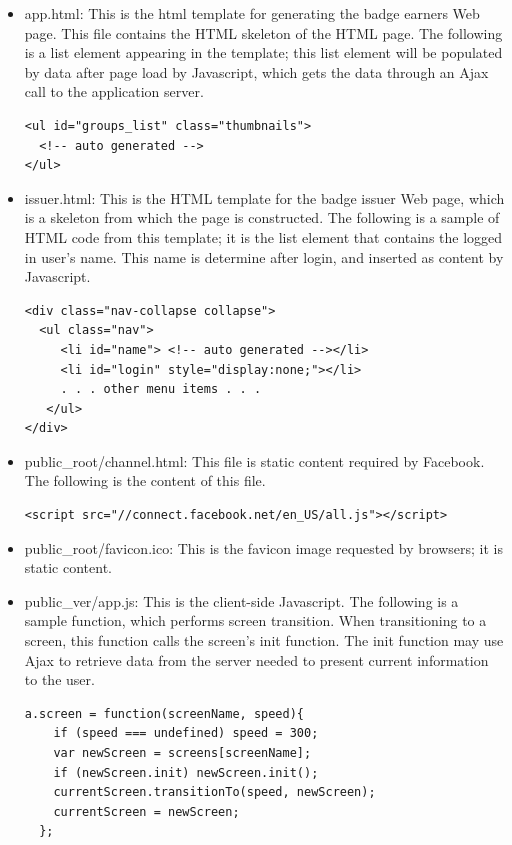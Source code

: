 \begin{itemize}
\item app.html: This is the html template for generating the badge earners Web page. This file contains the HTML skeleton of the HTML page. The following is a list element appearing in the template; this list element will be populated by data after page load by Javascript, which gets the data through an Ajax call to the application server.

\begin{lstlisting}
<ul id="groups_list" class="thumbnails">
  <!-- auto generated -->
</ul>  
\end{lstlisting}

\item issuer.html: This is the HTML template for the badge issuer Web page, which is a skeleton from which the page is constructed. The following is a sample of HTML code from this template; it is the list element that contains the logged in user's name.  This name is determine after login, and inserted as content by Javascript.

\begin{lstlisting}
<div class="nav-collapse collapse">
  <ul class="nav">
     <li id="name"> <!-- auto generated --></li>
     <li id="login" style="display:none;"></li>
     . . . other menu items . . .
   </ul>
</div>
\end{lstlisting}

\item public{\_}root/channel.html: This file is static content required by Facebook. The following is the content of this file.

\begin{lstlisting}
<script src="//connect.facebook.net/en_US/all.js"></script>
\end{lstlisting}

\item public{\_}root/favicon.ico: This is the favicon image requested by browsers; it is static content.
\item public{\_}ver/app.js: This is the client-side Javascript. The following is a sample function, which performs screen transition.  When transitioning to a screen, this function calls the screen's init function.  The init function may use Ajax to retrieve data from the server needed to present current information to the user.

\begin{lstlisting}
a.screen = function(screenName, speed){
    if (speed === undefined) speed = 300;
    var newScreen = screens[screenName];
    if (newScreen.init) newScreen.init();
    currentScreen.transitionTo(speed, newScreen);
    currentScreen = newScreen;
  };
\end{lstlisting}

\end{itemize}
